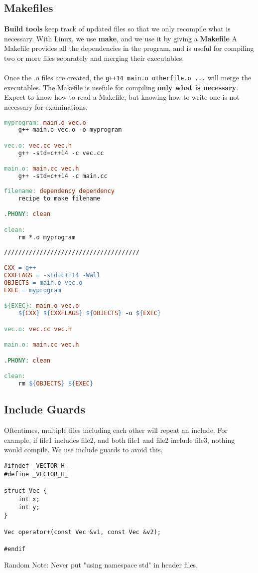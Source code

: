 \documentclass[12pt]{article}
\begin{document}
\subsection{Makefiles}
\textbf{Build tools} keep track of updated files so that we only recompile what is necessary. With Linux, we use \textbf{make}, and we use it by giving a \textbf{Makefile}
A Makefile provides all the dependencies in the program, and is useful for compiling two or more files separately and merging their executables.\\\\
Once the .o files are created, the \lstinline{g++14 main.o otherfile.o ...} will merge the executables. The Makefile is usefule for compiling \textbf{only what is necessary}. Expect to know how to read a Makefile, but knowing how to write one is not necessary for examinations.

\begin{lstlisting}[language=make]
myprogram: main.o vec.o
	g++ main.o vec.o -o myprogram

vec.o: vec.cc vec.h
	g++ -std=c++14 -c vec.cc

main.o: main.cc vec.h
	g++ -std=c++14 -c main.cc
	
filename: dependency dependency
    recipe to make filename

.PHONY: clean

clean:
	rm *.o myprogram
	
//////////////////////////////////////

CXX = g++
CXXFLAGS = -std=c++14 -Wall
OBJECTS = main.o vec.o
EXEC = myprogram

${EXEC}: main.o vec.o
	${CXX} ${CXXFLAGS} ${OBJECTS} -o ${EXEC}

vec.o: vec.cc vec.h

main.o: main.cc vec.h

.PHONY: clean

clean:
	rm ${OBJECTS} ${EXEC}
\end{lstlisting}
\subsection{Include Guards}
Oftentimes, multiple files including each other will repeat an include. For example, if file1 includes file2, and both file1 and file2 include file3, nothing would compile. We use include guards to avoid this.
\begin{lstlisting}
#ifndef _VECTOR_H_
#define _VECTOR_H_

struct Vec {
    int x;
    int y;
}

Vec operator+(const Vec &v1, const Vec &v2);

#endif
\end{lstlisting}
Random Note: Never put "using namespace std" in header files.
\end{document}
